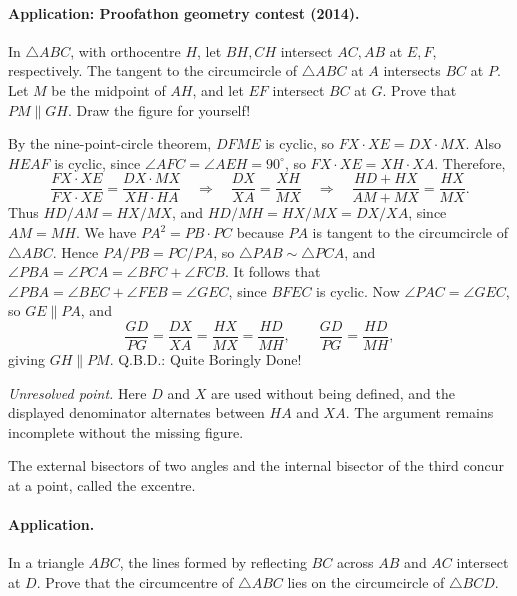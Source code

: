 \documentclass[11pt,a4paper]{article}
\begin{document}
\paragraph{Application: Proofathon geometry contest (2014).}
In $\triangle ABC$, with orthocentre $H$, let $BH,CH$ intersect $AC,AB$ at $E,F$, respectively.
The tangent to the circumcircle of $\triangle ABC$ at $A$ intersects $BC$ at $P$.
Let $M$ be the midpoint of $AH$, and let $EF$ intersect $BC$ at $G$.
Prove that $PM\parallel GH$. Draw the figure for yourself!

By the nine-point-circle theorem, $DFME$ is cyclic, so $FX\cdot XE=DX\cdot MX$.
Also $HEAF$ is cyclic, since $\angle AFC=\angle AEH=90^\circ$, so $FX\cdot XE=XH\cdot XA$.
Therefore,
\[
\frac{FX\cdot XE}{FX\cdot XE}=\frac{DX\cdot MX}{XH\cdot HA}
\quad\Longrightarrow\quad\frac{DX}{XA}=\frac{XH}{MX}
\quad\Longrightarrow\quad\frac{HD+HX}{AM+MX}=\frac{HX}{MX}.
\]
Thus $HD/AM=HX/MX$, and $HD/MH=HX/MX=DX/XA$, since $AM=MH$.
We have $PA^2=PB\cdot PC$ because $PA$ is tangent to the circumcircle of $\triangle ABC$.
Hence $PA/PB=PC/PA$, so $\triangle PAB\sim\triangle PCA$, and
$\angle PBA=\angle PCA=\angle BFC+\angle FCB$.
It follows that $\angle PBA=\angle BEC+\angle FEB=\angle GEC$, since $BFEC$ is cyclic.
Now $\angle PAC=\angle GEC$, so $GE\parallel PA$, and
\[
\frac{GD}{PG}=\frac{DX}{XA}=\frac{HX}{MX}=\frac{HD}{MH},
\qquad\frac{GD}{PG}=\frac{HD}{MH},
\]
giving $GH\parallel PM$.
Q.B.D.: Quite Boringly Done!

\emph{Unresolved point.} Here $D$ and $X$ are used without being defined, and the displayed denominator alternates between $HA$ and $XA$. The argument remains incomplete without the missing figure.

\setcounter{theorem}{90}\begin{lemma}[Excentre]\label{lemma:lb1-93}
The external bisectors of two angles and the internal bisector of the third concur at a point, called the excentre.
\end{lemma}
\paragraph{Application.}
In a triangle $ABC$, the lines formed by reflecting $BC$ across $AB$ and $AC$ intersect at $D$.
Prove that the circumcentre of $\triangle ABC$ lies on the circumcircle of $\triangle BCD$.
\end{document}
